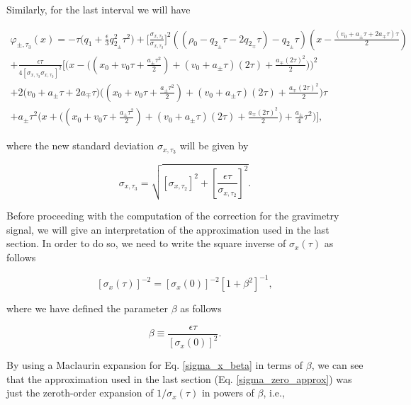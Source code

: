 \documentclass{article}
\begin{document}
Similarly, for the last interval we will have

\begin{multline}\label{quantum_phase_ignored_terms_simplified_t3}
\varphi_{\pm, \tau_{3}}(x) = -\tau \bigg(q_{1} + \frac{\epsilon}{3} q_{2_{\pm}}^{2} \tau^{2}\bigg) + \bigg[\frac{\sigma_{x, \tau_{2}}}{\sigma_{x, \tau_{3}}}\bigg]^{2}((\rho_{0} - q_{2_{\pm}} \tau-2q_{2_{\mp}}\tau)-q_{2_{\pm}} \tau)(x-\frac{(v_{0}+a_{\pm}\tau + 2a_{\mp}\tau) \tau}{2}) \\
+ \frac{\epsilon \tau}{4 [\sigma_{x, \tau_{3}}\sigma_{x, \tau_{3}}]^{2}} \bigg[\bigg(x-\Big((x_{0}+v_{0} \tau + \frac{a_{\pm}\tau^{2}}{2}) + (v_{0}+a_{\pm}\tau)(2\tau) + \frac{a_{\mp}(2\tau)^{2}}{2}\Big)\bigg)^{2}\\
+ 2\bigg(v_{0} + a_{\pm} \tau + 2a_{\mp} \tau\bigg)\bigg((x_{0}+v_{0} \tau + \frac{a_{\pm}\tau^{2}}{2}) + (v_{0}+a_{\pm}\tau)(2\tau) + \frac{a_{\mp}(2\tau)^{2}}{2}\bigg) \tau\\
+a_{\pm} \tau^{2} \bigg(x+\Big((x_{0}+v_{0} \tau + \frac{a_{\pm}\tau^{2}}{2}) + (v_{0}+a_{\pm}\tau)(2\tau) + \frac{a_{\mp}(2\tau)^{2}}{2}\Big)+ \frac{a_{\pm}}{4} \tau^{2} \bigg)\bigg],
\end{multline}

where the new standard deviation $\sigma_{x, \tau_{3}}$ will be given by 

\begin{equation}\label{sigma_x_t3}
\sigma_{x, \tau_{3}} = \sqrt{[\sigma_{x, \tau_{2}}]^{2} + \left[\frac{\epsilon \tau}{\sigma_{x, \tau_{2}}} \right]^{2}}.
\end{equation}

Before proceeding with the computation of the correction for the gravimetry signal, we will give an interpretation of the approximation used in the last section. In order to do so, we need to write the square inverse of $\sigma_{x}(\tau)$ as follows

\begin{equation}\label{sigma_x_beta}
[\sigma_{x}(\tau)]^{-2} = [\sigma_{x}(0)]^{-2}\left[1 + \beta^{2}\right]^{-1},
\end{equation}

where we have defined the parameter $\beta$ as follows

\begin{equation}\label{beta_parameter}
\beta \equiv \frac{\epsilon \tau}{[\sigma_{x}(0)]^{2}}.
\end{equation}

By using a Maclaurin expansion for Eq. \ref{sigma_x_beta} in terms of $\beta$, we can see that the approximation used in the last section (Eq. \ref{sigma_zero_approx}) was just the zeroth-order expansion of $1/\sigma_{x}(\tau)$ in powers of $\beta$, i.e.,
\end{document}
